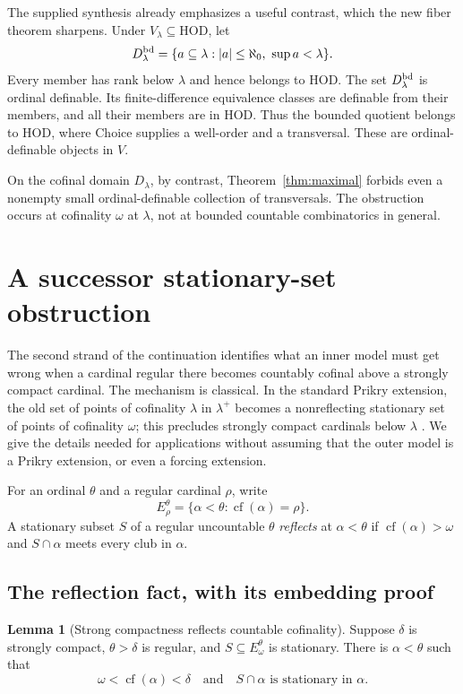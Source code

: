 \documentclass[11pt,letterpaper]{article}
\theoremstyle{definition}
\newtheorem{lemma}[definition]{Lemma}
\numberwithin{equation}{section}
\newcommand{\HOD}{\mathrm{HOD}}
\newcommand{\cf}{\operatorname{cf}}
\begin{document}
The supplied synthesis already emphasizes a useful contrast, which the new fiber theorem sharpens. Under $V_\lambda\subseteq\HOD$, let
\[
D^{\rm bd}_\lambda=\{a\subseteq\lambda:|a|\le\aleph_0,\ \sup a<\lambda\}.
\]
Every member has rank below $\lambda$ and hence belongs to $\HOD$. The set $D^{\rm bd}_\lambda$ is ordinal definable. Its finite-difference equivalence classes are definable from their members, and all their members are in $\HOD$. Thus the bounded quotient belongs to $\HOD$, where Choice supplies a well-order and a transversal. These are ordinal-definable objects in $V$.

On the cofinal domain $D_\lambda$, by contrast, Theorem~\ref{thm:maximal} forbids even a nonempty small ordinal-definable collection of transversals. The obstruction occurs at cofinality $\omega$ at $\lambda$, not at bounded countable combinatorics in general.

\section{A successor stationary-set obstruction}\label{sec:stationary}

The second strand of the continuation identifies what an inner model must get wrong when a cardinal regular there becomes countably cofinal above a strongly compact cardinal. The mechanism is classical. In the standard Prikry extension, the old set of points of cofinality $\lambda$ in $\lambda^+$ becomes a nonreflecting stationary set of points of cofinality $\omega$; this precludes strongly compact cardinals below $\lambda$ \cite{cummings}. We give the details needed for applications without assuming that the outer model is a Prikry extension, or even a forcing extension.

For an ordinal $\theta$ and a regular cardinal $\rho$, write
\[
E^\theta_\rho=\{\alpha<\theta:\cf(\alpha)=\rho\}.
\]
A stationary subset $S$ of a regular uncountable $\theta$ \emph{reflects} at $\alpha<\theta$ if $\cf(\alpha)>\omega$ and $S\cap\alpha$ meets every club in $\alpha$.

\subsection{The reflection fact, with its embedding proof}

\begin{lemma}[Strong compactness reflects countable cofinality]\label{lem:sc-reflection}
Suppose $\delta$ is strongly compact, $\theta>\delta$ is regular, and $S\subseteq E^\theta_\omega$ is stationary. There is $\alpha<\theta$ such that
\[
\omega<\cf(\alpha)<\delta
\quad\text{and}\quad S\cap\alpha\text{ is stationary in }\alpha.
\]
\end{lemma}
\end{document}

